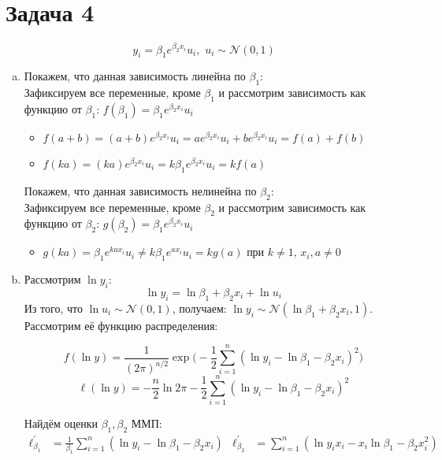 \documentclass[12pt,letterpaper]{article}
\begin{document}
\section*{Задача 4}
$$y_i = \beta_{1}e^{\beta_2 x_i}u_i, \, \, u_i \sim \mathcal{N}(0,1)$$
\begin{enumerate} [a)]
    \item 
    {
        Покажем, что данная зависимость линейна по $\beta_1$:\\
        
        Зафиксируем все переменные, кроме $\beta_1$ и рассмотрим зависимость как функцию от $\beta_1$: $f(\beta_1) = \beta_{1}e^{\beta_2 x_i}u_i$
        \begin{itemize}
            \item 
            {
                $f(a + b) = (a + b)e^{\beta_2 x_i}u_i = a e^{\beta_2 x_i}u_i + b e^{\beta_2 x_i}u_i = f(a) + f(b)$
            }
            \item
            {
                $f(ka) = (ka)e^{\beta_2 x_i}u_i = k \beta_{1}e^{\beta_2 x_i}u_i = kf(a)$
            }
        \end{itemize}
        
        Покажем, что данная зависимость нелинейна по $\beta_2$:\\
        
        Зафиксируем все переменные, кроме $\beta_2$ и рассмотрим зависимость как функцию от $\beta_2$: $g(\beta_2) = \beta_{1}e^{\beta_2 x_i}u_i$
        \begin{itemize}
            \item 
                $g(ka) = \beta_{1}e^{ka x_i}u_i \neq k\beta_{1}e^{a x_i}u_i = kg(a)$ при $k \neq 1, \, x_i,a \neq 0$            
        \end{itemize}
    }
    \item
    {
        Рассмотрим $\ln{y_i}$:
        $$\ln{y_i} = \ln{\beta_1} + \beta_2 x_i + \ln{u_i}$$
        Из того, что $\ln{u_i} \sim \mathcal{N}(0,1)$, получаем: $\ln{y_i} \sim \mathcal{N}(\ln{\beta_1} + \beta_2 x_i, 1)$. Рассмотрим её функцию распределения:
        
        $$f(\ln{y}) = \frac{1}{(2\pi)^{n/2}}\exp{\Big(-\frac{1}{2}\sum\limits_{i=1}^{n}(\ln{y_i} - \ln{\beta_1} - \beta_2 x_i)^2\Big)}$$
        $$\ell(\ln{y}) = -\frac{n}{2}\ln{2\pi} -\frac{1}{2}\sum\limits_{i=1}^{n}(\ln{y_i} - \ln{\beta_1} - \beta_2 x_i)^2$$
        
        Найдём оценки $\beta_1, \beta_2$ ММП:
        \begin{align*}
            \ell^{\prime}_{\beta_1} &= \frac{1}{\beta_1}\sum\limits_{i=1}^{n}(\ln{y_i} - \ln{\beta_1} - \beta_2 x_i) & 
            \ell^{\prime}_{\beta_2} &= \sum\limits_{i=1}^{n}(\ln{y_i}x_i - x_i\ln{\beta_1} - \beta_2 x_i^2)   
        \end{align*}
        
}
\end{enumerate}
\end{document}
